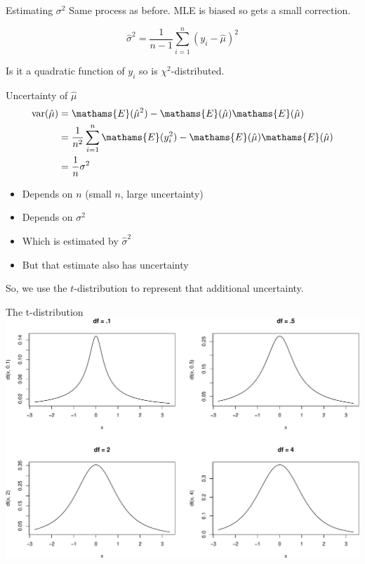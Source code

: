 \documentclass[
  ignorenonframetext,
]{beamer}
\providecommand{\tightlist}{%
  \setlength{\itemsep}{0pt}\setlength{\parskip}{0pt}}
\begin{document}
\begin{frame}{Estimating \(\sigma^2\)}
\protect\hypertarget{estimating-sigma2}{}
Same process as before. MLE is biased so gets a small correction.

\begin{equation}
\hat{\sigma}^2 = \frac{1}{n-1}\sum \limits^n_{i=1}(y_i-\hat{\mu})^2
\end{equation}

Is it a quadratic function of \(y_i\) so is \(\chi^2\)-distributed.
\end{frame}

\begin{frame}{Uncertainty of \(\hat{\mu}\)}
\protect\hypertarget{uncertainty-of-hatmu}{}
\begin{equation}
\begin{aligned}
\text{var}(\hat{\mu}) &= \mathams{E}(\hat{\mu}^2)-\mathams{E}(\hat{\mu})\mathams{E}(\hat{\mu})\\
&= \frac{1}{n^2}\sum\limits^n_{i=1}\mathams{E}(y_i^2)-\mathams{E}(\hat{\mu})\mathams{E}(\hat{\mu})\\
&= \frac{1}{n}\sigma^2
\end{aligned}
\end{equation}

\begin{itemize}
\tightlist
\item
  Depends on \(n\) (small \(n\), large uncertainty)
\item
  Depends on \(\sigma^2\)
\item
  Which is estimated by \(\hat{\sigma}^2\)
\item
  But that estimate also has uncertainty
\end{itemize}

So, we use the \(t\)-distribution to represent that additional
uncertainty.
\end{frame}

\begin{frame}{The t-distribution}
\protect\hypertarget{the-t-distribution}{}
\includegraphics{IntroLM_files/figure-beamer/unnamed-chunk-5-1.pdf}
\end{frame}
\end{document}
